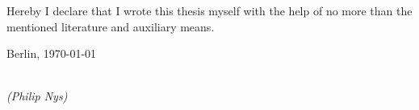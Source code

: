 \newpage

\thispagestyle{empty}

\begin{large}

\vspace*{6cm}

\noindent
Hereby I declare that I wrote this thesis myself with the help of no more than the mentioned literature and auxiliary means.
\vspace{2cm}

\noindent
Berlin, \today {}

\vspace{3cm}

\hspace*{7cm}%
\dotfill\\
\hspace*{8.5cm}%
\textit{(Philip Nys)}

\end{large}
